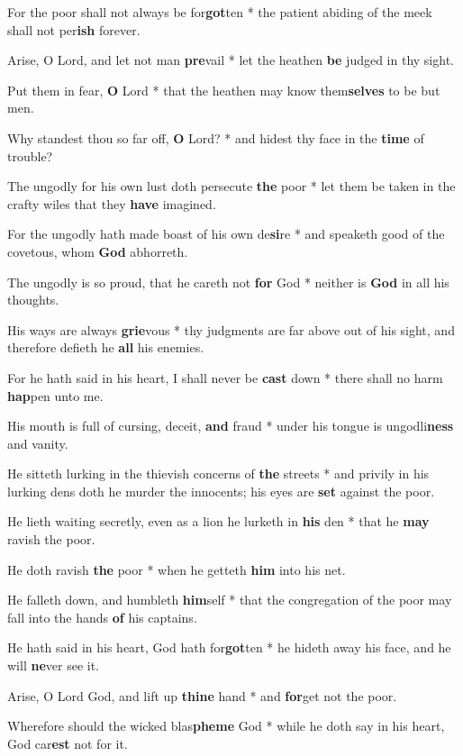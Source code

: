 \begin{multicols}{2}
	For the poor shall not always be for\textbf{got}ten * the patient abiding of the meek shall not per\textbf{ish} forever.
	
	Arise, O Lord, and let not man \textbf{pre}vail * let the heathen \textbf{be} judged in thy sight.
	
	Put them in fear, \textbf{O} Lord * that the heathen may know them\textbf{selves} to be but men.
	
	Why standest thou so far off, \textbf{O} Lord? * and hidest thy face in the \textbf{time} of trouble?
	
	The ungodly for his own lust doth persecute \textbf{the} poor * let them be taken in the crafty wiles that they \textbf{have} imagined.
	
	For the ungodly hath made boast of his own de\textbf{si}re * and speaketh good of the covetous, whom \textbf{God} abhorreth.
	
	The ungodly is so proud, that he careth not \textbf{for} God * neither is \textbf{God} in all his thoughts.
	
	His ways are always \textbf{grie}vous * thy judgments are far above out of his sight, and therefore defieth he \textbf{all} his enemies.
	
	For he hath said in his heart, I shall never be \textbf{cast} down * there shall no harm \textbf{hap}pen unto me.
	
	His mouth is full of cursing, deceit, \textbf{and} fraud * under his tongue is ungodli\textbf{ness} and vanity.
	
	He sitteth lurking in the thievish concerns of \textbf{the} streets * and privily in his lurking dens doth he murder the innocents; his eyes are \textbf{set} against the poor.
	
	He lieth waiting secretly, even as a lion he lurketh in \textbf{his} den * that he \textbf{may} ravish the poor.
	
	He doth ravish \textbf{the} poor * when he getteth \textbf{him} into his net.
	
	He falleth down, and humbleth \textbf{him}self * that the congregation of the poor may fall into the hands \textbf{of} his captains.
	
	He hath said in his heart, God hath for\textbf{got}ten * he hideth away his face, and he will \textbf{ne}ver see it.
	
	Arise, O Lord God, and lift up \textbf{thine} hand * and \textbf{for}get not the poor.
	
	Wherefore should the wicked blas\textbf{pheme} God * while he doth say in his heart, God car\textbf{est} not for it.
	

\end{multicols}
